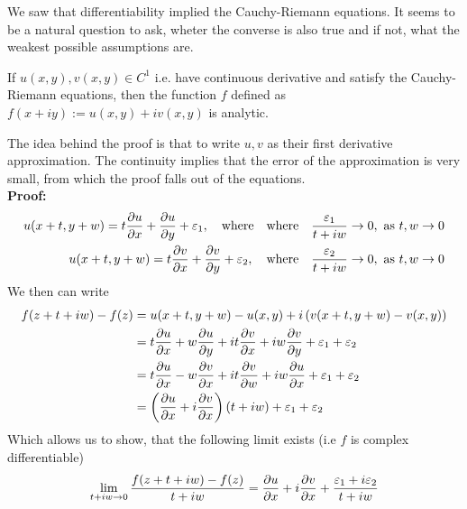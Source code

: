 We saw that differentiability implied the Cauchy-Riemann equations. It seems to be a natural question to ask, wheter the converse is also true and if not, what the weakest possible assumptions are.

\begin{theorem}[]
	If $u(x,y), v(x,y) \in C^1$ i.e. have continuous derivative and satisfy the Cauchy-Riemann equations, then the function $f$ defined as $f(x + iy) := u(x,y) + iv(x,y)$ is analytic.
\end{theorem}
The idea behind the proof is that to write $u,v$ as their first derivative approximation. The continuity implies that the error of the approximation is very small, from which the proof falls out of the equations.\\

\textbf{Proof:} \quad 
\begin{align*}
				u(x + t, y + w) = t \frac{\partial u}{\partial x} + \frac{\partial u}{\partial y} + \varepsilon_1, \quad \text{where} \quad \text{where} \quad \frac{\varepsilon_1}{t + iw} \to 0, \text{ as } t,w \to 0\\
				u(x + t, y + w) = t \frac{\partial v}{\partial x} + \frac{\partial v}{\partial y} + \varepsilon_2, \quad \text{where} \quad \frac{ \varepsilon_2}{t + iw} \to 0, \text{ as } t,w \to 0
\end{align*}
We then can write
\begin{align*}
				f(z + t + iw) - f(z) &= u(x + t,y+w) - u(x,y) + i \left(v(x+t,y+w) - v(x,y)\right)\\
														 &= t \frac{\partial u}{\partial x} + w \frac{\partial u}{\partial y} + it \frac{\partial v}{\partial x} + iw \frac{\partial v}{\partial y} + \varepsilon_1 + \varepsilon_2 \\
														 &= t \frac{\partial u}{\partial x} - w \frac{\partial v}{\partial x} + it \frac{\partial v}{\partial w} + iw \frac{\partial u}{\partial x} + \varepsilon_1 + \varepsilon_2\\
														 &= \left(\frac{\partial u}{\partial x} + i \frac{\partial v}{\partial x}\right)(t + iw) + \varepsilon_1 + \varepsilon_2
\end{align*}
Which allows us to show, that the following limit exists (i.e $f$ is complex differentiable)
\begin{align*}
				\lim_{t + iw \to 0} \frac{f(z + t + iw) - f(z)}{t + iw} = \frac{\partial u}{\partial x} + i \frac{\partial v}{\partial x} + \frac{ \varepsilon_1 + i \varepsilon_2}{t + iw}
\end{align*}


